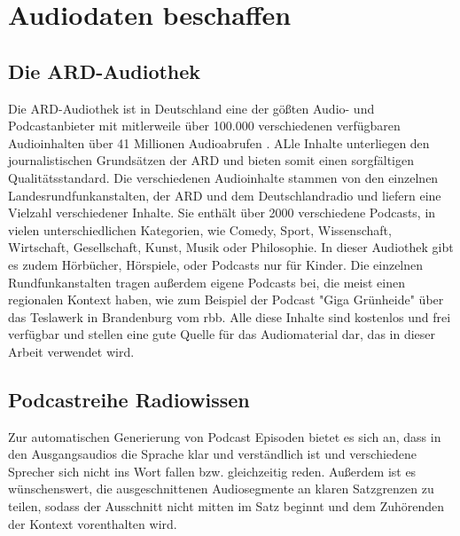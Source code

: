 
\section{Audiodaten beschaffen}

\subsection{Die ARD-Audiothek}

Die ARD-Audiothek ist in Deutschland eine der gößten Audio- und Podcastanbieter mit mitlerweile über 100.000 verschiedenen verfügbaren Audioinhalten über 41 Millionen Audioabrufen \cite{statista-a}.
ALle Inhalte unterliegen den journalistischen Grundsätzen der ARD und bieten somit einen sorgfältigen Qualitätsstandard. 
Die verschiedenen Audioinhalte stammen von den einzelnen Landesrundfunkanstalten, der ARD und dem Deutschlandradio und liefern eine Vielzahl verschiedener Inhalte.
Sie enthält über 2000 verschiedene Podcasts, in vielen unterschiedlichen Kategorien, wie Comedy, Sport, Wissenschaft, Wirtschaft, Gesellschaft, Kunst, Musik oder Philosophie. 
In dieser Audiothek gibt es zudem Hörbücher, Hörspiele, oder Podcasts nur für Kinder.
Die einzelnen Rundfunkanstalten tragen außerdem eigene Podcasts bei, die meist einen regionalen Kontext haben, wie zum Beispiel der Podcast "Giga Grünheide" über das Teslawerk in Brandenburg vom rbb.
Alle diese Inhalte sind kostenlos und frei verfügbar und stellen eine gute Quelle für das Audiomaterial dar, das in dieser Arbeit verwendet wird.







\subsection{Podcastreihe Radiowissen}

Zur automatischen Generierung von Podcast Episoden bietet es sich an, dass in den Ausgangsaudios die Sprache klar und verständlich ist und verschiedene Sprecher sich nicht ins Wort fallen bzw. gleichzeitig reden.
Außerdem ist es wünschenswert, die ausgeschnittenen Audiosegmente an klaren Satzgrenzen zu teilen, sodass der Ausschnitt nicht mitten im Satz beginnt und dem Zuhörenden der Kontext vorenthalten wird. 

